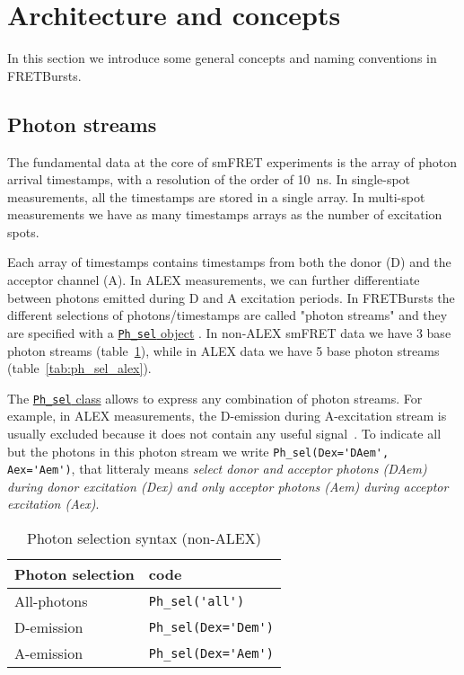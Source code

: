 \section{Architecture and concepts}

In this section we introduce some general concepts and naming conventions in FRETBursts.

\subsection{Photon streams}
\label{sec:ph_streams}

The fundamental data at the core of smFRET experiments is the array of photon arrival timestamps, with a resolution of the order of 10~ns. In single-spot measurements, all the timestamps are stored in a single array. In multi-spot measurements we have as many timestamps arrays as the number of excitation spots.

Each array of timestamps contains timestamps from both the donor (D) and the acceptor channel (A). In ALEX measurements, we can further differentiate between photons emitted during D and A excitation periods. In FRETBursts the different selections of photons/timestamps are called "photon streams" and they are specified with a \href{http://fretbursts.readthedocs.org/en/latest/ph_sel.html}{\texttt{Ph\_sel} object} . In non-ALEX smFRET data we have 3 base photon streams (table~\ref{tab:ph_sel_smfret}), while in ALEX data we have 5 base photon streams 
(table~\ref{tab:ph_sel_alex}).

The \href{http://fretbursts.readthedocs.org/en/latest/ph_sel.html}{\texttt{Ph\_sel} class} allows to express any combination of photon streams. 
For example, in ALEX measurements, the D-emission during A-excitation stream is usually excluded because it does not contain any useful signal~\cite{Lee_2005}. To indicate all but the photons in this photon stream we write \verb|Ph_sel(Dex='DAem', Aex='Aem')|, that litteraly means \textit{select donor and acceptor photons (DAem) during donor excitation (Dex) and only acceptor photons (Aem) during acceptor excitation (Aex)}.

\begin{table}
\begin{tabular}{l|l}
  Photon selection  & code \\
  \hline
  All-photons       & \verb|Ph_sel('all')|\\
  D-emission    & \verb|Ph_sel(Dex='Dem')|\\
  A-emission & \verb|Ph_sel(Dex='Aem')|\\
\end{tabular}
\caption{\label{tab:ph_sel_smfret}Photon selection syntax (non-ALEX)}
\end{table}

